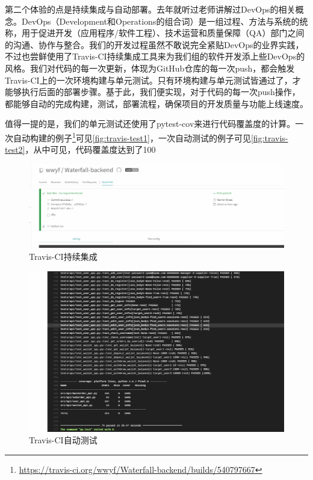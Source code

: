 第二个体验的点是持续集成与自动部署。去年就听过老师讲解过DevOps的相关概念。DevOps（Development和Operations的组合词）是一组过程、方法与系统的统称，用于促进开发（应用程序/软件工程）、技术运营和质量保障（QA）部门之间的沟通、协作与整合。我们的开发过程虽然不敢说完全紧贴DevOps的业界实践，不过也尝鲜使用了Travis-CI持续集成工具来为我们组的软件开发添上些DevOps的风格。我们对代码的每一次更新，体现为GitHub仓库的每一次push，都会触发Travis-CI上的一次环境构建与单元测试。只有环境构建与单元测试皆通过了，才能够执行后面的部署步骤。基于此，我们便实现，对于代码的每一次push操作，都能够自动的完成构建，测试，部署流程，确保项目的开发质量与功能上线速度。

值得一提的是，我们的单元测试还使用了pytest-cov来进行代码覆盖度的计算。一次自动构建的例子\footnote{\url{https://travis-ci.org/wwyf/Waterfall-backend/builds/540797667}}可见\autoref{fig:travis-test1}，一次自动测试的例子可见\autoref{fig:travis-test2}，从中可见，代码覆盖度达到了100%

\begin{figure}[htp]
    \centering
    \includegraphics[width=13cm]{report/figure/appendix2/test1.png}
    \caption{Travis-CI持续集成}
    \label{fig:travis-test1}
\end{figure}

\begin{figure}[htp]
    \centering
    \includegraphics[width=13cm]{report/figure/appendix2/test2.png}
    \caption{Travis-CI自动测试}
    \label{fig:travis-test2}
\end{figure}


